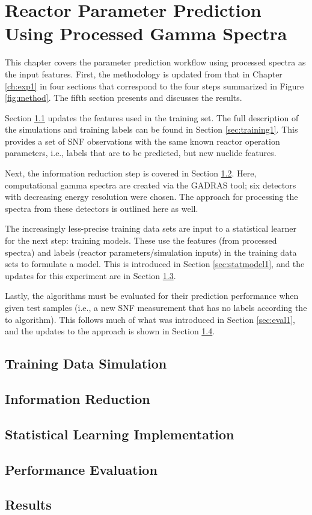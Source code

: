 \chapter{Reactor Parameter Prediction Using Processed Gamma Spectra}
\label{ch:exp2}

This chapter covers the parameter prediction workflow using processed spectra
as the input features. First, the methodology is updated from that in Chapter
\ref{ch:exp1} in four sections that correspond to the four steps summarized in
Figure \ref{fig:method}.  The fifth section presents and discusses the results.

Section \ref{sec:training2} updates the features used in the training set. The
full description of the simulations and training labels can be found in Section
\ref{sec:training1}.  This provides a set of \gls{SNF} observations with the
same known reactor operation parameters, i.e., labels that are to be predicted,
but new nuclide features.

Next, the information reduction step is covered in Section
\ref{sec:inforeduc2}.  Here, computational gamma spectra are created via the
\gls{GADRAS} tool; six detectors with decreasing energy resolution were chosen.
The approach for processing the spectra from these detectors is outlined here
as well. 

The increasingly less-precise training data sets are input to a statistical
learner for the next step: training models.  These use the features (from
processed spectra) and labels (reactor parameters/simulation inputs) in the
training data sets to formulate a model.  This is introduced in Section
\ref{sec:statmodel1}, and the updates for this experiment are in Section
\ref{sec:statmodel2}. 

Lastly, the algorithms must be evaluated for their prediction performance when
given test samples (i.e., a new \gls{SNF} measurement that has no labels
according the to algorithm).  This follows much of what was introduced in
Section \ref{sec:eval1}, and the updates to the approach is shown in Section
\ref{sec:eval2}. 

\section{Training Data Simulation}
\label{sec:training2}


\section{Information Reduction}
\label{sec:inforeduc2}


\section{Statistical Learning Implementation}
\label{sec:statmodel2}


\section{Performance Evaluation}
\label{sec:eval2}


\section{Results}
\label{sec:results2}

